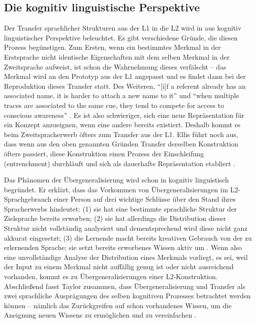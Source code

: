 \subsection{Die kognitiv linguistische Perspektive}
Der Transfer sprachlicher Strukturen aus der L1 in die L2 wird in \cite{Ellis06} aus kognitiv linguistischer Perspektive beleuchtet.
Es gibt verschiedene Gründe, die diesen Prozess begünstigen.
Zum Ersten, wenn ein bestimmtes Merkmal in der Erstsprache nicht identische Eigenschaften mit dem selben Merkmal in der Zweitsprache aufweist, ist schon die Wahrnehmung dieses verfälscht --
das Merkmal wird an den Prototyp aus der L1 angepasst und es findet dann bei der Reproduktion dieses Transfer statt.
Des Weiteren, ``[i]f a referent already has an associated name, it is harder to attach a new name to it'' und
``when multiple traces are associated to the same cue, they tend to compete for access to conscious awareness'' \cite[S.174-176]{Ellis06}.
Es ist also schwieriger, sich eine neue Repräsentation für ein Konzept anzueignen, wenn eine andere bereits existiert.
Deshalb kommt es beim Zweitspracherwerb öfters zum Transfer aus der L1.
Ellis führt noch aus, dass wenn aus den oben genannten Gründen Transfer derselben Konstruktion öfters passiert, diese Konstruktion einen Prozess der Einschleifung (entrenchment) durchläuft und sich als dauerhafte Repräsentation etabliert \cite{Ellis06}.

Das Phänomen der Übergeneralisierung wird schon in \cite{Taylor75} kognitiv linguistisch begründet.
Er erklärt, dass das Vorkommen von Übergeneralisierungen im L2-Sprachgebrauch einer Person auf drei wichtige Schlüsse über den Stand ihres Spracherwerbs hindeutet:
(1) sie hat eine bestimmte sprachliche Struktur der Zielsprache bereits erworben;
(2) sie hat allerdings die Distribution dieser Struktur nicht vollständig analysiert und dementsprechend wird diese nicht ganz akkurat eingesetzt;
(3) die Lernende macht bereits kreativen Gebrauch von der zu erlernenden Sprache; sie setzt bereits erworbenes Wissen aktiv um \cite[vgl.][S.74]{Taylor75}.
Wenn also eine unvollständige Analyse der Distribution eines Merkmals vorliegt, es sei, weil der Input zu einem Merkmal nicht auffällig genug ist oder nicht ausreichend vorhanden, kommt es zu Übergeneralisierungen einer L2-Konstruktion.
Abschließend fasst Taylor zusammen, dass Übergeneralisierung und Transfer als zwei sprachliche Ausprägungen des selben kognitiven Prozesses betrachtet werden können --
nämlich das Zurückgreifen auf schon vorhandenes Wissen, um die Aneignung neuen Wissens zu ermöglichen und zu vereinfachen \cite[vgl.][S.87]{Taylor75}.




